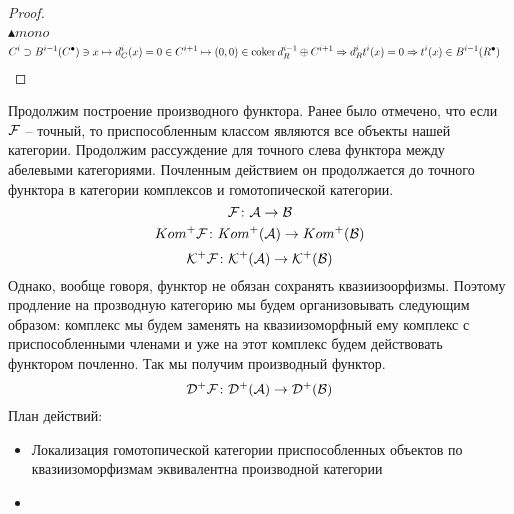 \documentclass[../main.tex]{subfiles}
\begin{document}
\begin{proof}
\begin{align*}
\end{align*}
$\blacktriangle mono$
\begin{align*}
    C^{i} \supset B^{i-1}(C^\bullet) \ni x \mapsto d^i_C(x) = 0 \in C^{i+1} \mapsto (0, 0) \in \operatorname{coker} d^{i-1}_R\oplus C^{i+1} & \Rightarrow d^i_Rt^i(x) = 0 \Rightarrow t^i(x) \in B^{i-1}(R^\bullet)
\end{align*}
\end{proof}
Продолжим построение производного функтора. Ранее было отмечено, что если $\mathcal{F}$ -- точный, то приспособленным классом являются все объекты нашей категории. Продолжим рассуждение для точного слева функтора между абелевыми категориями. Почленным действием он продолжается до точного функтора в категории комплексов и гомотопической категории.
\[\mathcal{F}\colon \mathcal{A} \to \mathcal{B}\]
\[Kom^+\mathcal{F}\colon Kom^+(\mathcal{A}) \to Kom^+(\mathcal{B})\]
\[\mathcal{K^+ F}\colon \mathcal{K^+(\mathcal{A})} \to \mathcal{K^+(\mathcal{B})}\]
Однако, вообще говоря, функтор не обязан сохранять квазиизоорфизмы. Поэтому продление на прозводную категорию мы будем организовывать следующим образом: комплекс мы будем заменять на квазиизоморфный ему комплекс с приспособленными членами и уже на этот комплекс будем действовать функтором почленно. Так мы получим производный функтор.
\[\mathcal{D^+ F} \colon \mathcal{D^+(\mathcal{A})} \to \mathcal{D^+(\mathcal{B})}\]
План действий:\\
\begin{itemize}
    \item Локализация гомотопической категории приспособленных объектов по квазиизоморфизмам эквивалентна производной категории
    \item {}
\end{itemize}
\end{document}
